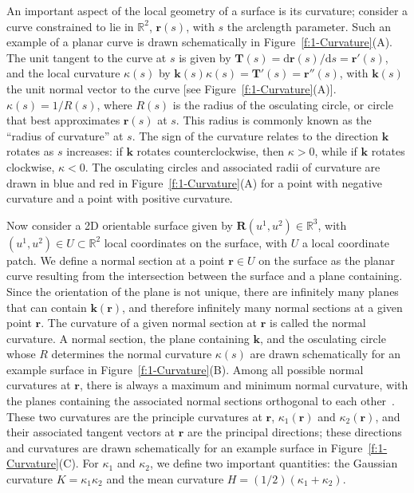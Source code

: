 An important aspect of the local geometry of a surface is its curvature; consider a curve constrained to lie in $\mathbb{R}^2$, $\mathbf{r}(s)$, with $s$ the arclength parameter.
Such an example of a planar curve is drawn schematically in Figure~\ref{f:1-Curvature}(A).
The unit tangent to the curve at $s$ is given by $\mathbf{T}(s) = \textrm{d} \mathbf{r}(s)/\textrm{d}s = \mathbf{r}'(s)$, and the local curvature $\kappa(s)$ by $\mathbf{k}(s)\kappa(s) = \mathbf{T}'(s) = \mathbf{r}''(s) $, with $\mathbf{k}(s)$ the unit normal vector to the curve [see Figure~\ref{f:1-Curvature}(A)].
$\kappa(s) = 1/R(s)$, where $R(s)$ is the radius of the osculating circle, or circle that best approximates $\mathbf{r}(s)$ at $s$.
This radius is commonly known as the ``radius of curvature'' at $s$.
The sign of the curvature relates to the direction $\mathbf{k}$ rotates as $s$ increases: if $\mathbf{k}$ rotates counterclockwise, then $\kappa > 0$, while if $\mathbf{k}$ rotates clockwise, $\kappa < 0$.
The osculating circles and associated radii of curvature are drawn in blue and red in Figure~\ref{f:1-Curvature}(A) for a point with negative curvature and a point with positive curvature.

Now consider a 2D orientable surface given by $\mathbf{R}(u^1,u^2) \in \mathbb{R}^3$, with $(u^1,u^2) \in U \subset \mathbb{R}^2$ local coordinates on the surface, with $U$ a local coordinate patch.
We define a normal section at a point $\mathbf{r} \in U$ on the surface as the planar curve resulting from the intersection between the surface and a plane containing.
Since the orientation of the plane is not unique, there are infinitely many planes that can contain $\mathbf{k}(\mathbf{r})$, and therefore infinitely many normal sections at a given point $\mathbf{r}$.
The curvature of a given normal section at $\mathbf{r}$ is called the normal curvature.
A normal section, the plane containing $\mathbf{k}$, and the osculating circle whose $R$ determines the normal curvature $\kappa(s)$ are drawn schematically for an example surface in Figure~\ref{f:1-Curvature}(B).
Among all possible normal curvatures at $\mathbf{r}$, there is always a maximum and minimum normal curvature, with the planes containing the associated normal sections orthogonal to each other~\cite{RN35}.
These two curvatures are the principle curvatures at $\mathbf{r}$, $\kappa_1 (\mathbf{r})$ and $\kappa_2(\mathbf{r})$, and their associated tangent vectors at $\mathbf{r}$ are the principal directions; these directions and curvatures are drawn schematically for an example surface in Figure~\ref{f:1-Curvature}(C).
For $\kappa_1$ and $\kappa_2$, we define two important quantities: the Gaussian curvature $K  = \kappa_1 \kappa_2$ and the mean curvature $H = (1/2) (\kappa_1+\kappa_2)$.

